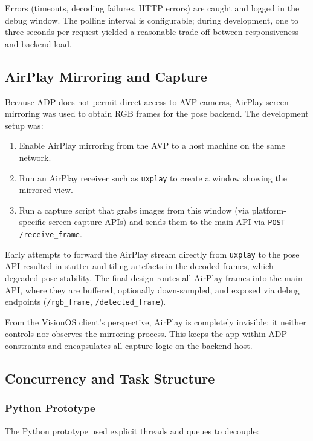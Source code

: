 Errors (timeouts, decoding failures, HTTP errors) are caught and logged in the debug window. The polling interval is configurable; during development, one to three seconds per request yielded a reasonable trade-off between responsiveness and backend load.

\subsection{AirPlay Mirroring and Capture}
\label{subsec:airplay-dev}

Because ADP does not permit direct access to AVP cameras, AirPlay screen mirroring was used to obtain RGB frames for the pose backend. The development setup was:

\begin{enumerate}
    \item Enable AirPlay mirroring from the AVP to a host machine on the same network.
    \item Run an AirPlay receiver such as \texttt{uxplay} to create a window showing the mirrored view.
    \item Run a capture script that grabs images from this window (via platform-specific screen capture APIs) and sends them to the main API via \texttt{POST /receive\_frame}.
\end{enumerate}

Early attempts to forward the AirPlay stream directly from \texttt{uxplay} to the pose API resulted in stutter and tiling artefacts in the decoded frames, which degraded pose stability. The final design routes all AirPlay frames into the main API, where they are buffered, optionally down-sampled, and exposed via debug endpoints (\texttt{/rgb\_frame}, \texttt{/detected\_frame}).  

From the VisionOS client’s perspective, AirPlay is completely invisible: it neither controls nor observes the mirroring process. This keeps the app within ADP constraints and encapsulates all capture logic on the backend host.

\subsection{Concurrency and Task Structure}

\subsubsection{Python Prototype}

The Python prototype used explicit threads and queues to decouple:

